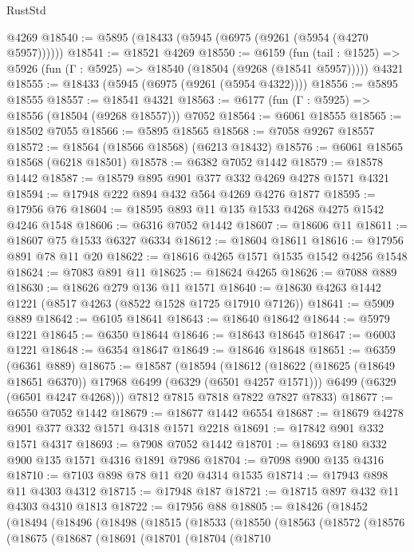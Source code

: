 \begin{lexlean}{RustStd}
\begin{coremodule}
{{    @4269
@18540 := @5895 (@18433 (@5945 (@6975 (@9261 (@5954 (@4270 @5957))))))
@18541 := @18521 @4269
@18550 := @6159
    (fun (tail : @1525) => @5926 (fun (Γ : @5925) => @18540 (@18504 (@9268 (@18541 @5957)))))
    @4321
@18555 := @18433 (@5945 (@6975 (@9261 (@5954 @4322))))
@18556 := @5895 @18555
@18557 := @18541 @4321
@18563 := @6177 (fun (Γ : @5925) => @18556 (@18504 (@9268 @18557))) @7052
@18564 := @6061 @18555
@18565 := @18502 @7055
@18566 := @5895 @18565
@18568 := @7058 @9267 @18557
@18572 := @18564 (@18566 @18568) (@6213 @18432)
@18576 := @6061 @18565 @18568 (@6218 @18501)
@18578 := @6382 @7052 @1442
@18579 := @18578 @1442
@18587 := @18579 @895 @901 @377 @332 @4269 @4278 @1571 @4321
@18594 := @17948 @222 @894 @432 @564 @4269 @4276 @1877
@18595 := @17956 @76
@18604 := @18595 @893 @11 @135 @1533 @4268 @4275 @1542 @4246 @1548
@18606 := @6316 @7052 @1442
@18607 := @18606 @11
@18611 := @18607 @75 @1533 @6327 @6334
@18612 := @18604 @18611
@18616 := @17956 @891 @78 @11 @20
@18622 := @18616 @4265 @1571 @1535 @1542 @4256 @1548
@18624 := @7083 @891 @11
@18625 := @18624 @4265
@18626 := @7088 @889
@18630 := @18626 @279 @136 @11 @1571
@18640 := @18630 @4263 @1442 @1221 (@8517 @4263 (@8522 @1528 @1725 @17910 @7126))
@18641 := @5909 @889
@18642 := @6105 @18641
@18643 := @18640 @18642
@18644 := @5979 @1221
@18645 := @6350 @18644
@18646 := @18643 @18645
@18647 := @6003 @1221
@18648 := @6354 @18647
@18649 := @18646 @18648
@18651 := @6359 (@6361 @889)
@18675 := @18587
    (@18594
      (@18612
        (@18622 (@18625 (@18649 @18651 @6370)) @17968 @6499 (@6329 (@6501 @4257 @1571)))
        @6499
        (@6329 (@6501 @4247 @4268)))
      @7812
      @7815
      @7818
      @7822
      @7827
      @7833)
@18677 := @6550 @7052 @1442
@18679 := @18677 @1442 @6554
@18687 := @18679 @4278 @901 @377 @332 @1571 @4318 @1571 @2218
@18691 := @17842 @901 @332 @1571 @4317
@18693 := @7908 @7052 @1442
@18701 := @18693 @180 @332 @900 @135 @1571 @4316 @1891 @7986
@18704 := @7098 @900 @135 @4316
@18710 := @7103 @898 @78 @11 @20 @4314 @1535
@18714 := @17943 @898 @11 @4303 @4312
@18715 := @17948 @187
@18721 := @18715 @897 @432 @11 @4303 @4310 @1813
@18722 := @17956 @88
@18805 := @18426
    (@18452
      (@18494
        (@18496
          (@18498
            (@18515
              (@18533
                (@18550
                  (@18563
                    (@18572
                      (@18576
                        (@18675
                          (@18687
                            (@18691
                              (@18701
                                (@18704
                                  (@18710
}}
\end{coremodule}
\end{lexlean}

